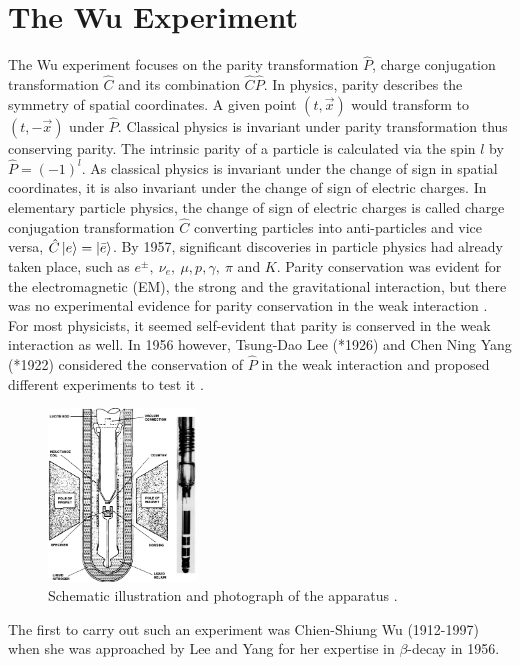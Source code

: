 \chapter{The Wu Experiment}
\label{cha:wu_exp}

The Wu experiment focuses on the parity transformation $\hat P$, charge conjugation transformation $\hat C$ and its combination $\hat C\hat P$.
In physics, parity describes the symmetry of spatial coordinates.
A given point $(t, \vec x)$ would transform to $(t, -\vec x)$ under $\hat P$.
Classical physics is invariant under parity transformation thus conserving parity.
The intrinsic parity of a particle is calculated via the spin $l$ by $ \hat P=(-1)^l$.
As classical physics is invariant under the change of sign in spatial coordinates, it is also invariant under the change of sign of electric charges.
In elementary particle physics, the change of sign of electric charges is called charge conjugation transformation $\hat C$ converting particles into anti-particles and vice versa, $\hat C \ket{e} = \ket{\bar e}$.
By 1957, significant discoveries in particle physics had already taken place, such as $e^\pm,\ \nu_e,\ \mu, p, \gamma,\ \pi$ and $K$.
Parity conservation was evident for the electromagnetic (EM), the strong and the gravitational interaction, but there was no experimental evidence for parity conservation in the weak interaction \cite{CaseStudies}.
For most physicists, it seemed self-evident that parity is conserved in the weak interaction as well.
In 1956 however, Tsung-Dao Lee (*1926) and Chen Ning Yang (*1922) considered the conservation of $\hat P$ in the weak interaction and proposed different experiments to test it  \cite{PhysRev.104.254}.
\begin{figure}
    \centering
    \includegraphics[width=0.35\textwidth]{figs/setup.png}
    \caption{Schematic illustration and photograph of the apparatus \cite{NIST}.}
    \label{fig:setup}
\end{figure}
The first to carry out such an experiment was Chien-Shiung Wu (1912-1997) when she was approached by Lee and Yang for her expertise in $\beta$-decay in 1956.
